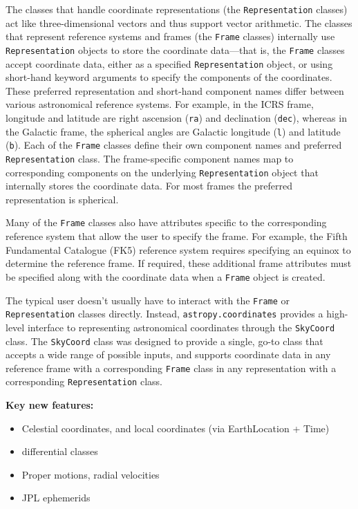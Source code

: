 \documentclass[modern]{aastex61}
\begin{document}
The classes that handle coordinate representations (the \texttt{Representation}
classes) act like three-dimensional vectors and thus support vector arithmetic.
The classes that represent reference systems and frames (the \texttt{Frame}
classes) internally use \texttt{Representation} objects to store the coordinate
data---that is, the \texttt{Frame} classes accept coordinate data, either as a
specified \texttt{Representation} object, or using short-hand keyword arguments
to specify the components of the coordinates.
These preferred representation and short-hand component names differ between
various astronomical reference systems.
For example, in the ICRS frame, longitude and latitude are right ascension
(\texttt{ra}) and declination (\texttt{dec}), whereas in the Galactic frame, the
spherical angles are Galactic longitude (\texttt{l}) and latitude (\texttt{b}).
Each of the \texttt{Frame} classes define their own component names and
preferred \texttt{Representation} class.
The frame-specific component names map to corresponding components on the
underlying \texttt{Representation} object that internally stores the coordinate
data.
For most frames the preferred representation is spherical.

Many of the \texttt{Frame} classes also have attributes specific to the
corresponding reference system that allow the user to specify the frame.
For example, the Fifth Fundamental Catalogue (FK5) reference system requires
specifying an equinox to determine the reference frame.
If required, these additional frame attributes must be specified along with the
coordinate data when a \texttt{Frame} object is created.

The typical user doesn't usually have to interact with the \texttt{Frame} or
\texttt{Representation} classes directly.
Instead, \texttt{astropy.coordinates} provides a high-level interface to
representing astronomical coordinates through the \texttt{SkyCoord} class.
The \texttt{SkyCoord} class was designed to provide a single, go-to class that
accepts a wide range of possible inputs, and supports coordinate data in any
reference frame with a corresponding \texttt{Frame} class in any representation
with a corresponding \texttt{Representation} class.


\textbf{Key new features:}
\begin{itemize}
	\item Celestial coordinates, and local coordinates (via EarthLocation + Time)
    \item differential classes
    \item Proper motions, radial velocities
    \item JPL ephemerids
\end{itemize}
\end{document}
